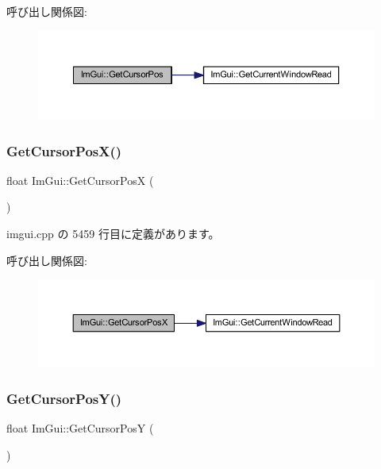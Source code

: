 呼び出し関係図\+:\nopagebreak
\begin{figure}[H]
\begin{center}
\leavevmode
\includegraphics[width=350pt]{namespace_im_gui_a2fa4eb57e0f73b90e8edcd226a0cc7d5_cgraph}
\end{center}
\end{figure}
\mbox{\label{namespace_im_gui_a022e32c808ac899e25847f4d65633b77}} 
\subsubsection{\texorpdfstring{Get\+Cursor\+Pos\+X()}{GetCursorPosX()}}
{\footnotesize\ttfamily float Im\+Gui\+::\+Get\+Cursor\+PosX (\begin{DoxyParamCaption}{ }\end{DoxyParamCaption})}



 imgui.\+cpp の 5459 行目に定義があります。

呼び出し関係図\+:\nopagebreak
\begin{figure}[H]
\begin{center}
\leavevmode
\includegraphics[width=350pt]{namespace_im_gui_a022e32c808ac899e25847f4d65633b77_cgraph}
\end{center}
\end{figure}
\mbox{\label{namespace_im_gui_a86e409551f256b542166989c558d41c1}} 
\subsubsection{\texorpdfstring{Get\+Cursor\+Pos\+Y()}{GetCursorPosY()}}
{\footnotesize\ttfamily float Im\+Gui\+::\+Get\+Cursor\+PosY (\begin{DoxyParamCaption}{ }\end{DoxyParamCaption})}



